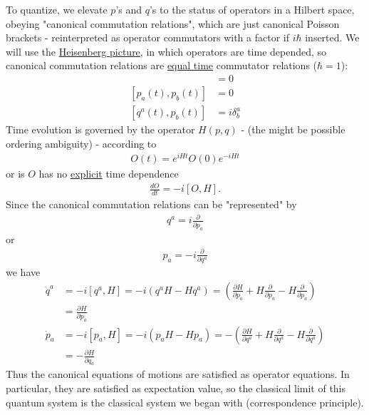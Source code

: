 \documentclass{article}
\begin{document}
To quantize, we elevate $p$'s and $q$'s to the status of operators in a Hilbert space, obeying "canonical commutation relations", which are just canonical Poisson brackets - reinterpreted as operator commutators with a factor if $i\hbar$ inserted. We will use the \underline{Heisenberg picture}, in which operators are time depended, so canonical commutation relations are \underline{equal time} commutator relations ($\hbar=1$):
\begin{align}
[q^a(t),q^b(t)]&=0\\
[p_a(t),p_b(t)]&=0\\
[q^a(t),p_b(t)]&=i\delta^a_b
\end{align}
Time evolution is governed by the operator $H(p,q)$ - (the might be possible ordering ambiguity) - according to
\begin{align}
O(t)=e^{iHt}O(0)e^{-iHt}
\end{align}
or is $O$ has no \underline{explicit} time dependence
\begin{align}
\frac{dO}{dt}=-i[O,H].
\end{align}
Since the canonical commutation relations can be "represented" by
\begin{align}
q^a=i\frac{\partial}{\partial p_a}
\end{align}
or
\begin{align}
p_a=-i\frac{\partial}{\partial q^a}
\end{align}
we have
\begin{align}
\dot{q}^a&=-i[q^a,H]=-i(q^aH-Hq^a)=\left(\frac{\partial H}{\partial p_a}+H\frac{\partial}{\partial p_a}-H\frac{\partial}{\partial p_a}\right)\\
&=\frac{\partial H}{\partial p_a}\\
\dot{p}_a&=-i[p_a,H]=-i(p_aH-Hp_a)=-\left(\frac{\partial H}{\partial q^a}+H\frac{\partial}{\partial q^a}-H\frac{\partial}{\partial q^a}\right)\\
&=-\frac{\partial H}{\partial q_a}
\end{align}
Thus the canonical equations of motions are satisfied as operator equations. In particular, they are satisfied as expectation value, so the classical limit of this quantum system is the classical system we began with (correspondence principle).
\end{document}

